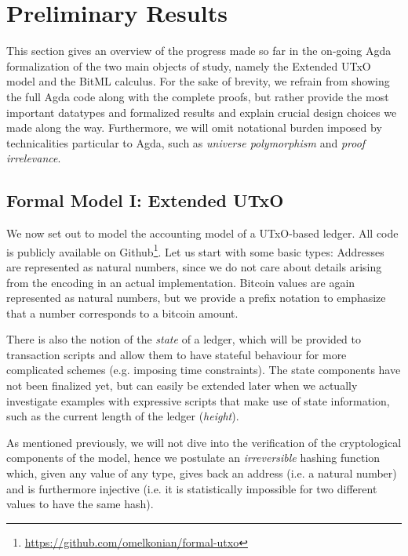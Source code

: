 \documentclass[acmsmall,nonacm=true,screen=true]{acmart}
\newcommand\site[1]{\footnote{\url{#1}}}
\begin{document}
\newpage
\section{Preliminary Results}
\label{sec:results}
This section gives an overview of the progress made so far in the on-going Agda formalization of the two main objects of study,
namely the Extended UTxO model and the BitML calculus.
For the sake of brevity, we refrain from showing the full Agda code along with the complete proofs, but rather
provide the most important datatypes and formalized results and explain crucial design choices we made along the way.
Furthermore, we will omit notational burden imposed by technicalities particular to Agda, such as \textit{universe polymorphism}
and \textit{proof irrelevance}.

\subsection{Formal Model I: Extended UTxO} \label{subsec:eutxo}
We now set out to model the accounting model of a UTxO-based ledger.
All code is publicly available on Github\site{https://github.com/omelkonian/formal-utxo}.
Let us start with some basic types:
\UTXObasicTypes{}
Addresses are represented as natural numbers, since we do not care about details arising from the encoding in an
actual implementation. Bitcoin values are again represented as natural numbers, but we provide a prefix notation
to emphasize that a number corresponds to a bitcoin amount.

There is also the notion of the \textit{state} of a ledger, which will be provided to transaction scripts and allow
them to have stateful behaviour for more complicated schemes (e.g. imposing time constraints).
\UTXOstate{}
The state components have not been finalized yet, but can easily be extended later when we actually investigate
examples with expressive scripts that make use of state information, such as the current length of the ledger (\textit{height}).

As mentioned previously, we will not dive into the verification of the cryptological components of the model,
hence we postulate an \textit{irreversible} hashing function which, given any value of any type,
gives back an address (i.e. a natural number) and is furthermore injective (i.e. it is statistically impossible for two different
values to have the same hash).
\UTXOhash{}
\end{document}
